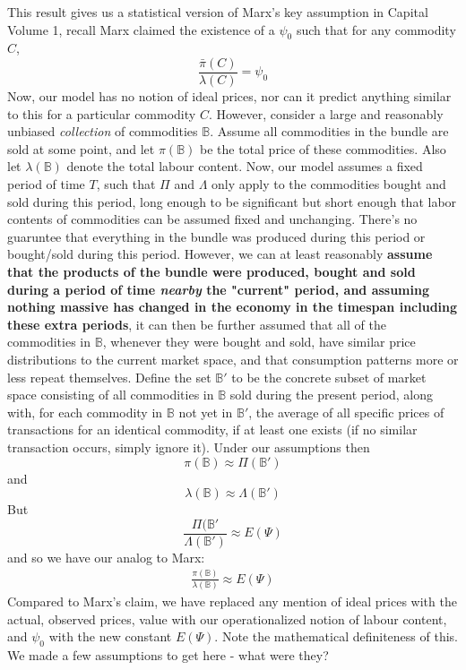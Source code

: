\documentclass{article}
\theoremstyle{definition}
\theoremstyle{plain}
\theoremstyle{theorem}
\begin{document}
This result gives us a statistical version of Marx's key assumption in Capital Volume 1, recall Marx claimed the existence of a $\psi_0$ such that for any commodity $C$, 
	\[ \frac{\bar{\pi}(C)}{\lambda(C)} = \psi_0 \]
Now, our model has no notion of ideal prices, nor can it predict anything similar to this for a particular commodity $C$. However, consider a large and reasonably unbiased \textit{collection} of commodities $\mathbb{B}$. Assume all commodities in the bundle are sold at some point, and let $\pi(\mathbb{B})$ be the total price of these commodities. Also let $\lambda(\mathbb{B})$ denote the total labour content. Now, our model assumes a fixed period of time $T$, such that $\Pi$ and $\Lambda$ only apply to the commodities bought and sold during this period, long enough to be significant but short enough that labor contents of commodities can be assumed fixed and unchanging. There's no guaruntee that everything in the bundle was produced during this period or bought/sold during this period. However, we can at least reasonably \textbf{assume that the products of the bundle were produced, bought and sold during a period of time \textit{nearby} the "current" period, and assuming nothing massive has changed in the economy in the timespan including these extra periods}, it can then be further assumed that all of the commodities in $\mathbb{B}$, whenever they were bought and sold, have similar price distributions to the current market space, and that consumption patterns more or less repeat themselves. Define the set $\mathbb{B}'$ to be the concrete subset of market space consisting of all commodities in $\mathbb{B}$ sold during the present period, along with, for each commodity in $\mathbb{B}$ not yet in $\mathbb{B}'$, the average of all specific prices of transactions for an identical commodity, if at least one exists (if no similar transaction occurs, simply ignore it). Under our assumptions then  
\[ \pi(\mathbb{B}) \approx \Pi(\mathbb{B}') \] 
and
\[ \lambda(\mathbb{B}) \approx \Lambda(\mathbb{B}') \]
But 
\[ \frac{\Pi(\mathbb{B}'}{\Lambda(\mathbb{B}')} \approx E(\Psi) \]
and so we have our analog to Marx:
\begin{align}
	\frac{\pi(\mathbb{B})}{\lambda(\mathbb{B})} \approx E(\Psi)
\end{align}
Compared to Marx's claim, we have replaced any mention of ideal prices with the actual, observed prices, value with our operationalized notion of labour content, and $\psi_0$ with the new constant $E(\Psi)$. Note the mathematical definiteness of this. We made a few assumptions to get here - what were they?
\end{document}
